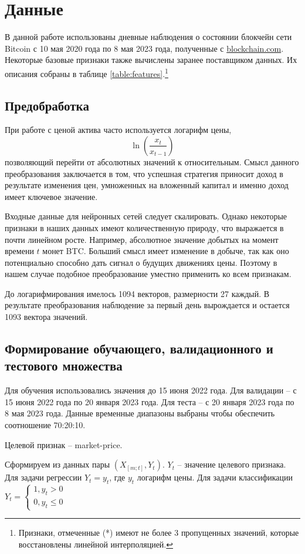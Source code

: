 \documentclass[diploma]{nanolab2015}
\begin{document}
\section{Данные}
В данной работе использованы дневные наблюдения о состоянии блокчейн сети Bitcoin с 10 мая 2020 года по 8 мая 2023 года, полученные с \href{https://www.blockchain.com/explorer/charts}{blockchain.com}. Некоторые базовые признаки также вычислены заранее поставщиком данных. Их описания собраны в таблице \ref{table:features}.\footnote{Признаки, отмеченные (*) имеют не более 3 пропущенных значений, которые восстановлены линейной интерполяцией.}

\subsection{Предобработка}
При работе с ценой актива часто используется логарифм цены,
$$
    \ln\left(\frac{x_{t}}{x_{t-1}}\right)
$$
позволяющий перейти от абсолютных значений к относительным. Смысл данного преобразования заключается в том, что успешная стратегия приносит доход в результате изменения цен, умноженных на вложенный капитал и именно доход имеет ключевое значение.

Входные данные для нейронных сетей следует скалировать. Однако некоторые признаки в наших данных имеют количественную природу, что выражается в почти линейном росте. Например, абсолютное значение добытых на момент времени $t$ монет BTC. Больший смысл имеет изменение в добыче, так как оно потенциально способно дать сигнал о будущих движениях цены. Поэтому в нашем случае подобное преобразование уместно применить ко всем признакам.

До логарифмирования имелось 1094 векторов, размерности 27 каждый. В результате преобразования наблюдение за первый день вырождается и остается 1093 вектора значений.

\subsection{Формирование обучающего, валидационного и тестового множества}
Для обучения использовались значения до 15 июня 2022 года. Для валидации -- с 15 июня 2022 года по 20 января 2023 года. Для теста -- с 20 января 2023 года по 8 мая 2023 года. Данные временные диапазоны выбраны чтобы обеспечить соотношение 70:20:10.

Целевой признак -- market-price.

Сформируем из данных пары $(X_{[m;t]}, Y_{t})$. $Y_t$ -- значение целевого признака. Для задачи регрессии $Y_t = y_t$, где $y_t$ логарифм цены. Для задачи классификации
$
    Y_t =
    \begin{cases}
        1, y_t > 0 \\
        0, y_t \le 0
    \end{cases}
$
\end{document}

